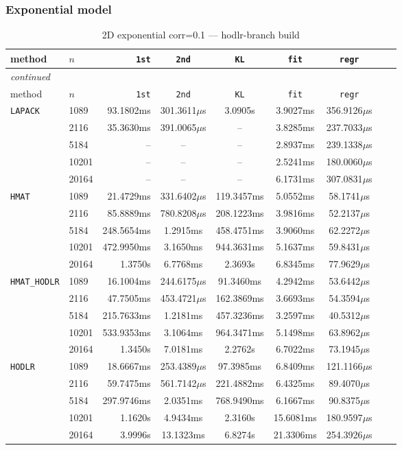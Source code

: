 \documentclass[11pt,a4paper]{article}
\begin{document}
\subsubsection*{Exponential model}
\begin{center}
\begin{longtable}{llrcccccc}
\caption{2D exponential corr=0.1 --- hodlr-branch build}
\\\toprule
method & $n$ & \texttt{1st} & \texttt{2nd} & \texttt{KL} & \texttt{fit} & \texttt{regr}\\
\midrule
\endfirsthead
\multicolumn{8}{l}{\small\emph{continued}}\\
\toprule
method & $n$ & \texttt{1st} & \texttt{2nd} & \texttt{KL} & \texttt{fit} & \texttt{regr}\\
\midrule
\endhead

\texttt{LAPACK} & 1089 & 93.1802ms & 301.3611$\mu$s & 3.0905s & 3.9027ms & 356.9126$\mu$s\\
 & 2116 & 35.3630ms & 391.0065$\mu$s & -- & 3.8285ms & 237.7033$\mu$s\\
 & 5184 & -- & -- & -- & 2.8937ms & 239.1338$\mu$s\\
 & 10201 & -- & -- & -- & 2.5241ms & 180.0060$\mu$s\\
 & 20164 & -- & -- & -- & 6.1731ms & 307.0831$\mu$s\\
\texttt{HMAT} & 1089 & 21.4729ms & 331.6402$\mu$s & 119.3457ms & 5.0552ms & 58.1741$\mu$s\\
 & 2116 & 85.8889ms & 780.8208$\mu$s & 208.1223ms & 3.9816ms & 52.2137$\mu$s\\
 & 5184 & 248.5654ms & 1.2915ms & 458.4751ms & 3.9060ms & 62.2272$\mu$s\\
 & 10201 & 472.9950ms & 3.1650ms & 944.3631ms & 5.1637ms & 59.8431$\mu$s\\
 & 20164 & 1.3750s & 6.7768ms & 2.3693s & 6.8345ms & 77.9629$\mu$s\\
\texttt{HMAT\_HODLR} & 1089 & 16.1004ms & 244.6175$\mu$s & 91.3460ms & 4.2942ms & 53.6442$\mu$s\\
 & 2116 & 47.7505ms & 453.4721$\mu$s & 162.3869ms & 3.6693ms & 54.3594$\mu$s\\
 & 5184 & 215.7633ms & 1.2181ms & 457.3236ms & 3.2597ms & 40.5312$\mu$s\\
 & 10201 & 533.9353ms & 3.1064ms & 964.3471ms & 5.1498ms & 63.8962$\mu$s\\
 & 20164 & 1.3450s & 7.0181ms & 2.2762s & 6.7022ms & 73.1945$\mu$s\\
\texttt{HODLR} & 1089 & 18.6667ms & 253.4389$\mu$s & 97.3985ms & 6.8409ms & 121.1166$\mu$s\\
 & 2116 & 59.7475ms & 561.7142$\mu$s & 221.4882ms & 6.4325ms & 89.4070$\mu$s\\
 & 5184 & 297.9746ms & 2.0351ms & 768.9490ms & 6.1667ms & 90.8375$\mu$s\\
 & 10201 & 1.1620s & 4.9434ms & 2.3160s & 15.6081ms & 180.9597$\mu$s\\
 & 20164 & 3.9996s & 13.1323ms & 6.8274s & 21.3306ms & 254.3926$\mu$s\\
\bottomrule\end{longtable}\end{center}
\end{document}
